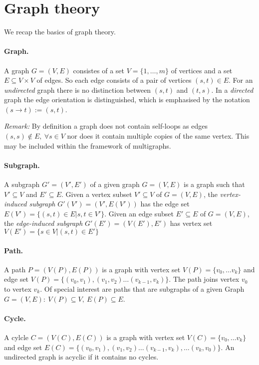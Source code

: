 \section{Graph theory}
We recap the basics of graph theory. \cite{MAL-001, Bollobas98a}

\paragraph*{Graph.} A graph $G=(V,E)$ consistes of a set $V = \{1, \dots, m\}$ of vertices  and a set  $E \subseteq V\times V$  of edges.  So each edge consists of a pair of vertices $(s,t) \in E$.  For an \textit{undirected} graph there is no distinction between $(s,t)$ and $(t,s)$. In a \textit{directed} graph the edge orientation is distinguished, which is emphasised by the notation $(s \rightarrow t) := (s,t)$.

\textit{Remark:} By definition a graph does not contain self-loops as edges $(s,s)\notin E, ~ \forall s \in V$ nor does it contain multiple copies of the same vertex. This may be included within the framework of multigraphs.

\paragraph*{Subgraph.} A subgraph $G'=(V',E')$ of a given graph $G=(V,E)$  is a graph such that $V' \subseteq V$ and $E' \subseteq E$. 
Given a vertex subset $V'\subseteq V$ of $G=(V,E)$, the \textit{vertex-induced subgraph} $G'(V')=(V', E(V'))$  has the edge set $E(V') = \{(s,t) \in E | s,t \in V' \}$. 
Given an edge subset $E' \subseteq E$ of $G=(V,E)$, the \textit{edge-induced subgraph} $G'(E')=(V(E'), E')$ has vertex set $V(E') = \{s \in V | (s,t) \in E' \}$  

\paragraph*{Path.} A path $P=(V(P), E(P))$ is a graph with vertex set $V(P)=\{v_0, \dots v_k\}$ and edge set $V(P)=\{(v_0, v_1), (v_1,v_2) \dots(v_{k-1}, v_k)\}$. The path joins vertex $v_0$ to vertex $v_k$. Of special interest are paths that are subgraphs of a given Graph $G=(V,E): ~ V(P)\subseteq V, ~ E(P)\subseteq E $. 

\paragraph*{Cycle.} A cylcle $C = (V(C), E(C))$ is a graph with vertex set $V(C)=\{v_0, \dots v_k\}$ and edge set $E(C)=\{(v_0, v_1), (v_1,v_2) \dots(v_{k-1}, v_k), \dots(v_k, v_0) \}$. An undirected graph is acyclic if it contains no cycles.
